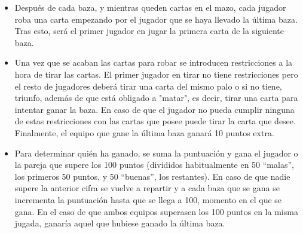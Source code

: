 \documentclass[]{article}
\begin{document}
\begin{description}
\begin{itemize}
\item{Después de cada baza, y mientras queden cartas en el mazo, cada jugador roba una carta empezando por el jugador que se haya llevado la última baza. Tras esto, será el primer jugador en jugar la primera carta de la siguiente baza.}
\item{Una vez que se acaban las cartas para robar se introducen restricciones a la hora de tirar las cartas. El primer jugador en tirar no tiene restricciones pero el resto de jugadores deberá tirar una carta del mismo palo o si no tiene, triunfo, además de que está obligado a "matar", es decir, tirar una carta para intentar ganar la baza. En caso de que el jugador no pueda cumplir ninguna de estas restricciones con las cartas que posee puede tirar la carta que desee. Finalmente, el equipo que gane la última baza ganará 10 puntos extra.}
\item{Para determinar quién ha ganado, se suma la puntuación y gana el jugador o la pareja que supere los 100 puntos (divididos habitualmente en 50 “malas”, los primeros 50 puntos, y 50 “buenas”, los restantes). En caso de que nadie supere la anterior cifra se vuelve a repartir y a cada baza que se gana se incrementa la puntuación hasta que se llega a 100, momento en el que se gana. En el caso de que ambos equipos superasen los 100 puntos en la misma jugada, ganaría aquel que hubiese ganado la última baza.}
\end{itemize}
\end{description}
%
\newpage

\end{document}
